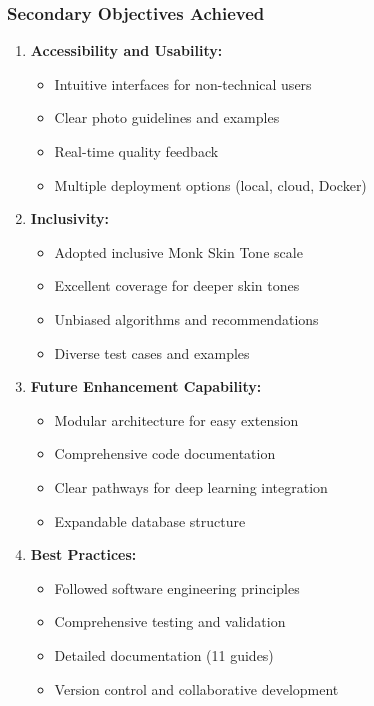 \subsubsection{Secondary Objectives Achieved}

\begin{enumerate}
    \item \textbf{Accessibility and Usability:}
    \begin{itemize}
        \item Intuitive interfaces for non-technical users
        \item Clear photo guidelines and examples
        \item Real-time quality feedback
        \item Multiple deployment options (local, cloud, Docker)
    \end{itemize}
    
    \item \textbf{Inclusivity:}
    \begin{itemize}
        \item Adopted inclusive Monk Skin Tone scale
        \item Excellent coverage for deeper skin tones
        \item Unbiased algorithms and recommendations
        \item Diverse test cases and examples
    \end{itemize}
    
    \item \textbf{Future Enhancement Capability:}
    \begin{itemize}
        \item Modular architecture for easy extension
        \item Comprehensive code documentation
        \item Clear pathways for deep learning integration
        \item Expandable database structure
    \end{itemize}
    
    \item \textbf{Best Practices:}
    \begin{itemize}
        \item Followed software engineering principles
        \item Comprehensive testing and validation
        \item Detailed documentation (11 guides)
        \item Version control and collaborative development
    \end{itemize}
\end{enumerate}


